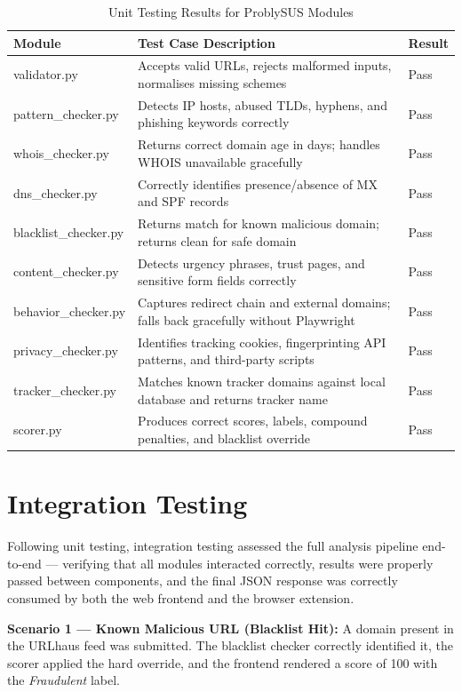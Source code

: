 \begin{table}[h]
\centering
\begin{tabular}{|p{}|p{}|p{}|}
\toprule
Module & Test Case Description & Result \\
\midrule
validator.py & Accepts valid URLs, rejects malformed inputs, normalises missing schemes & Pass \\
pattern\_checker.py & Detects IP hosts, abused TLDs, hyphens, and phishing keywords correctly & Pass \\
whois\_checker.py & Returns correct domain age in days; handles WHOIS unavailable gracefully & Pass \\
dns\_checker.py & Correctly identifies presence/absence of MX and SPF records & Pass \\
blacklist\_checker.py & Returns match for known malicious domain; returns clean for safe domain & Pass \\
content\_checker.py & Detects urgency phrases, trust pages, and sensitive form fields correctly & Pass \\
behavior\_checker.py & Captures redirect chain and external domains; falls back gracefully without Playwright & Pass \\
privacy\_checker.py & Identifies tracking cookies, fingerprinting API patterns, and third-party scripts & Pass \\
tracker\_checker.py & Matches known tracker domains against local database and returns tracker name & Pass \\
scorer.py & Produces correct scores, labels, compound penalties, and blacklist override & Pass \\
\bottomrule
\end{tabular}
\caption{Unit Testing Results for ProblySUS Modules}
\end{table}

\section{Integration Testing}

Following unit testing, integration testing assessed the full analysis pipeline end-to-end — verifying that all modules interacted correctly, results were properly passed between components, and the final JSON response was correctly consumed by both the web frontend and the browser extension.

\textbf{Scenario 1 — Known Malicious URL (Blacklist Hit):}  
A domain present in the URLhaus feed was submitted. The blacklist checker correctly identified it, the scorer applied the hard override, and the frontend rendered a score of 100 with the \textit{Fraudulent} label.

